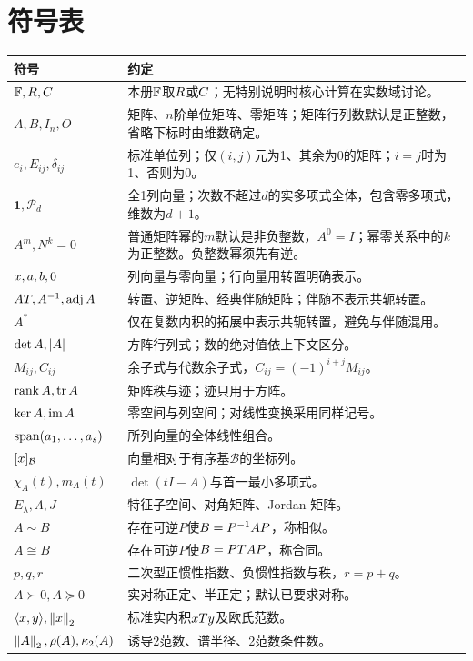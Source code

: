 \chapter*{符号表}
\begin{longtable}{@{}p{}p{}@{}}
\toprule 符号&约定\\\midrule\endhead
$\mathbb{F},R,C$&本册$\mathbb{F}$取$R$或$C$；无特别说明时核心计算在实数域讨论。\\
$A,B,I_n,O$&矩阵、$n$阶单位矩阵、零矩阵；矩阵行列数默认是正整数，省略下标时由维数确定。\\
$e_i,E_{ij},\delta_{ij}$&标准单位列；仅$(i,j)$元为1、其余为0的矩阵；$i=j$时为1、否则为0。\\
$\bm1,\mathcal P_d$&全1列向量；次数不超过$d$的实多项式全体，包含零多项式，维数为$d+1$。\\
$A^m,N^k=0$&普通矩阵幂的$m$默认是非负整数，$A^0=I$；幂零关系中的$k$为正整数。负整数幂须先有逆。\\
$x,a,b,0$&列向量与零向量；行向量用转置明确表示。\\
$AT,A^{-1},\operatorname{adj} A$&转置、逆矩阵、经典伴随矩阵；伴随不表示共轭转置。\\
$A^*$&仅在复数内积的拓展中表示共轭转置，避免与伴随混用。\\
$\det A,\left|A\right|$&方阵行列式；数的绝对值依上下文区分。\\
$M_{ij},C_{ij}$&余子式与代数余子式，$C_{ij}=(-1)^{i+j}M_{ij}$。\\
$\operatorname{rank} A,\operatorname{tr} A$&矩阵秩与迹；迹只用于方阵。\\
$\ker A,\operatorname{im} A$&零空间与列空间；对线性变换采用同样记号。\\
$\operatorname{span}(a_1,\ldots,a_s)$&所列向量的全体线性组合。\\
$[x]_{\mathcal B}$&向量相对于有序基$\mathcal B$的坐标列。\\
$\chi_A(t),m_A(t)$&$\det(tI-A)$与首一最小多项式。\\
$E_\lambda,\Lambda,J$&特征子空间、对角矩阵、Jordan 矩阵。\\
$A\sim B$&存在可逆$P$使$B=P^{-1} AP$，称相似。\\
$A\cong B$&存在可逆$P$使$B=PT AP$，称合同。\\
$p,q,r$&二次型正惯性指数、负惯性指数与秩，$r=p+q$。\\
$A\succ0,A\succeq0$&实对称正定、半正定；默认已要求对称。\\
$\langle x,y\rangle,\left\lVert x\right\rVert_2$&标准实内积$xTy$及欧氏范数。\\
$\left\lVert A\right\rVert_2,\rho(A),\kappa_2(A)$&诱导2范数、谱半径、2范数条件数。\\
\bottomrule
\end{longtable}
